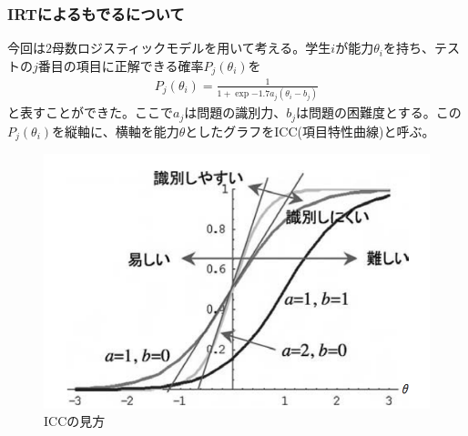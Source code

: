 \documentclass[12pt]{jarticle}
\begin{document}
\subsubsection{IRTによるもでるについて}
今回は$2$母数ロジスティックモデルを用いて考える。学生$i$が能力$\theta_i$を持ち、テストの$j$番目の項目に正解できる確率$P_j(\theta_i)$を
\begin{align}
  \label{00}
  \displaystyle P_j(\theta_i) = \frac{1}{1 + \exp{-1.7a_j}(\theta_i - b_j)} \tag{1}
\end{align}
と表すことができた。ここで$a_j$は問題の識別力、$b_j$は問題の困難度とする。この$P_j(\theta_i)$を縦軸に、横軸を能力$\theta$としたグラフをICC(項目特性曲線)と呼ぶ。
\newpage
\begin{figure}[H]
  \includegraphics[bb = -300 300 1 1,scale = 0.4]{01.png}
  \vspace{4cm}
  \caption{ICCの見方}
\end{figure}
\end{document}
